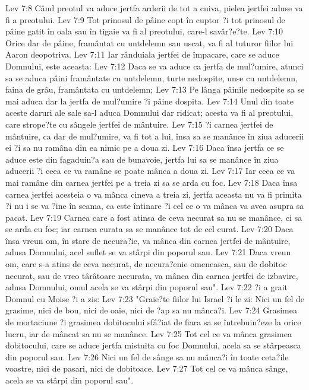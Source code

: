 Lev 7:8  Când preotul va aduce jertfa arderii de tot a cuiva, pielea jertfei aduse va fi a preotului.
Lev 7:9  Tot prinosul de pâine copt în cuptor ?i tot prinosul de pâine gatit în oala sau în tigaie va fi al preotului, care-l savâr?e?te.
Lev 7:10  Orice dar de pâine, framântat cu untdelemn sau uscat, va fi al tuturor fiilor lui Aaron deopotriva.
Lev 7:11  Iar rânduiala jertfei de împacare, care se aduce Domnului, este aceasta:
Lev 7:12  Daca se va aduce ca jertfa de mul?umire, atunci sa se aduca pâini framântate cu untdelemn, turte nedospite, unse cu untdelemn, faina de grâu, framântata cu untdelemn;
Lev 7:13  Pe lânga pâinile nedospite sa se mai aduca dar la jertfa de mul?umire ?i pâine dospita.
Lev 7:14  Unul din toate aceste daruri ale sale sa-l aduca Domnului dar ridicat; acesta va fi al preotului, care strope?te cu sângele jertfei de mântuire.
Lev 7:15  ?i carnea jertfei de mântuire, ca dar de mul?umire, va fi tot a lui, însa sa se manânce în ziua aducerii ei ?i sa nu ramâna din ea nimic pe a doua zi.
Lev 7:16  Daca însa jertfa ce se aduce este din fagaduin?a sau de bunavoie, jertfa lui sa se manânce în ziua aducerii ?i ceea ce va ramâne se poate mânca a doua zi.
Lev 7:17  Iar ceea ce va mai ramâne din carnea jertfei pe a treia zi sa se arda cu foc.
Lev 7:18  Daca însa carnea jertfei acesteia o va mânca cineva a treia zi, jertfa aceasta nu va fi primita ?i nu i se va ?ine în seama, ca este întinare ?i cel ce o va mânca va avea asupra sa pacat.
Lev 7:19  Carnea care a fost atinsa de ceva necurat sa nu se manânce, ci sa se arda cu foc; iar carnea curata sa se manânce tot de cel curat.
Lev 7:20  Daca însa vreun om, în stare de necura?ie, va mânca din carnea jertfei de mântuire, adusa Domnului, acel suflet se va stârpi din poporul sau.
Lev 7:21  Daca vreun om, care s-a atins de ceva necurat, de necura?enie omeneasca, sau de dobitoc necurat, sau de vreo târâtoare necurata, va mânca din carnea jertfei de izbavire, adusa Domnului, omul acela se va stârpi din poporul sau".
Lev 7:22  ?i a grait Domnul cu Moise ?i a zis:
Lev 7:23  "Graie?te fiilor lui Israel ?i le zi: Nici un fel de grasime, nici de bou, nici de oaie, nici de ?ap sa nu mânca?i.
Lev 7:24  Grasimea de mortaciune ?i grasimea dobitocului sfâ?iat de fiara sa se întrebuin?eze la orice lucru, iar de mâncat sa nu se manânce.
Lev 7:25  Tot cel ce va mânca grasimea dobitocului, care se aduce jertfa mistuita cu foc Domnului, acela sa se stârpeasca din poporul sau.
Lev 7:26  Nici un fel de sânge sa nu mânca?i în toate ceta?ile voastre, nici de pasari, nici de dobitoace.
Lev 7:27  Tot cel ce va mânca sânge, acela se va stârpi din poporul sau".
